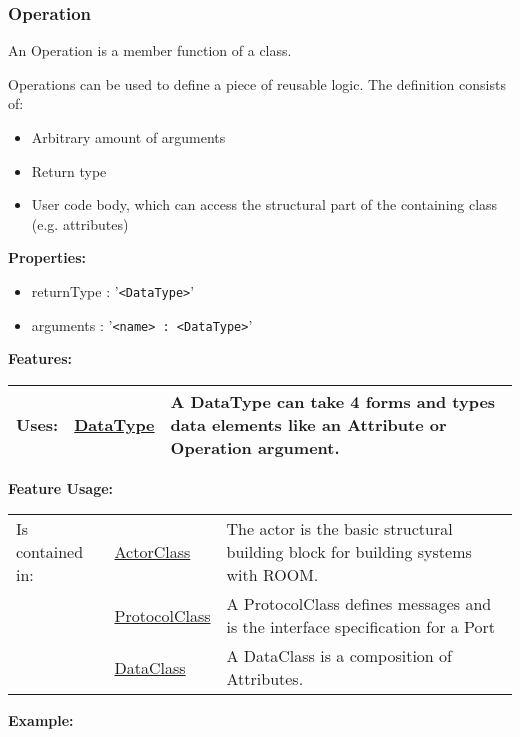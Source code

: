 \subsubsection{Operation}
	\hypertarget{ref:Operation}{}
	An Operation is a member function of a class.
		
	Operations can be used to define a piece of reusable logic. The definition consists of:
	\begin{itemize}
		\item Arbitrary amount of arguments
		\item Return type
		\item User code body, which can access the structural part of the containing class (e.g. attributes)
	\end{itemize}
		
	\textbf{Properties:}
	\begin{itemize}
	\item returnType : '\verb|<DataType>|'
	\item arguments : '\verb|<name> : <DataType>|'
	\end{itemize}
		
	\begingroup
	\textbf{Features:}
	\renewcommand{\arraystretch}{1.8} %
	\begin{longtable}{l|l p{}}
		\hline
	Uses: & \tabitem \hyperlink{ref:DataType}{DataType}  & A DataType can take 4 forms and types data elements like an Attribute or Operation argument.\\
	\hline
	\end{longtable}
	\endgroup
		
	\begingroup
	\textbf{Feature Usage:}
	\renewcommand{\arraystretch}{1.8} %
	\begin{longtable}{l|l p{}}
		\hline
	Is contained in: & \tabitem \hyperlink{ref:ActorClass}{ActorClass}  & The actor is the basic structural building block for building systems with ROOM.\\
	& \tabitem \hyperlink{ref:ProtocolClass}{ProtocolClass}  & A ProtocolClass defines messages and is the interface specification for a Port \\
	& \tabitem \hyperlink{ref:DataClass}{DataClass}  & A DataClass is a composition of Attributes. \\
	\hline
	\end{longtable}
	\endgroup
		
	\textbf{Example:}
	
